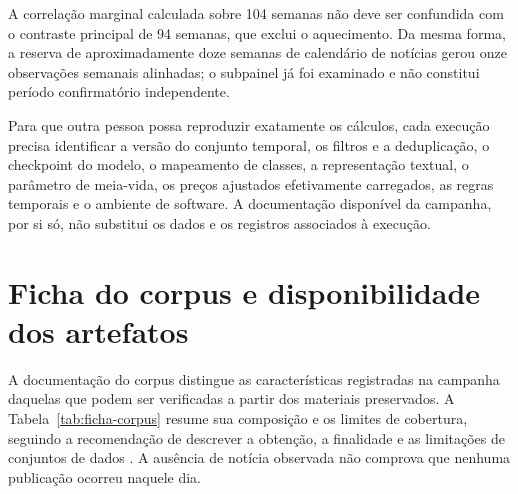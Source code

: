 A correlação marginal calculada sobre 104 semanas não deve ser confundida com o contraste principal de 94 semanas, que exclui o aquecimento. Da mesma forma, a reserva de aproximadamente doze semanas de calendário de notícias gerou onze observações semanais alinhadas; o subpainel já foi examinado e não constitui período confirmatório independente.

Para que outra pessoa possa reproduzir exatamente os cálculos, cada execução precisa identificar a versão do conjunto temporal, os filtros e a deduplicação, o checkpoint do modelo, o mapeamento de classes, a representação textual, o parâmetro de meia-vida, os preços ajustados efetivamente carregados, as regras temporais e o ambiente de software. A documentação disponível da campanha, por si só, não substitui os dados e os registros associados à execução.


\section{Ficha do corpus e disponibilidade dos artefatos}

A documentação do corpus distingue as características registradas na campanha daquelas que podem ser verificadas a partir dos materiais preservados. A Tabela~\ref{tab:ficha-corpus} resume sua composição e os limites de cobertura, seguindo a recomendação de descrever a obtenção, a finalidade e as limitações de conjuntos de dados \cite{gebru2021datasheets}. A ausência de notícia observada não comprova que nenhuma publicação ocorreu naquele dia.

